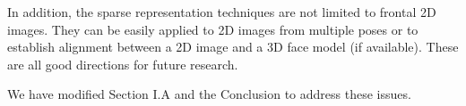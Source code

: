 \documentclass[11pt]{article}
\begin{document}
\begin{enumerate}
In addition, the sparse representation techniques are not limited to frontal 2D images.
They can be easily applied to 2D images from multiple poses or to establish alignment
between a 2D image and a 3D face model (if available). These are all good directions
for future research. 

We have modified Section I.A and the Conclusion to address these issues.

\end{enumerate}
\end{document}
